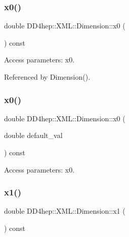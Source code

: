 \subsubsection{\texorpdfstring{x0()}{x0()}\hspace{0.1cm}{\footnotesize\ttfamily [1/2]}}
{\footnotesize\ttfamily double D\+D4hep\+::\+X\+M\+L\+::\+Dimension\+::x0 (\begin{DoxyParamCaption}{ }\end{DoxyParamCaption}) const}



Access parameters\+: x0. 



Referenced by Dimension().

\hypertarget{struct_d_d4hep_1_1_x_m_l_1_1_dimension_af9f958b21cd45072fca22d29a6dd86b4}{}\label{struct_d_d4hep_1_1_x_m_l_1_1_dimension_af9f958b21cd45072fca22d29a6dd86b4} 
\subsubsection{\texorpdfstring{x0()}{x0()}\hspace{0.1cm}{\footnotesize\ttfamily [2/2]}}
{\footnotesize\ttfamily double D\+D4hep\+::\+X\+M\+L\+::\+Dimension\+::x0 (\begin{DoxyParamCaption}\item[{double}]{default\+\_\+val }\end{DoxyParamCaption}) const}



Access parameters\+: x0. 

\hypertarget{struct_d_d4hep_1_1_x_m_l_1_1_dimension_a6ba1cf49b1320c22f96e3be85916e8c5}{}\label{struct_d_d4hep_1_1_x_m_l_1_1_dimension_a6ba1cf49b1320c22f96e3be85916e8c5} 
\subsubsection{\texorpdfstring{x1()}{x1()}\hspace{0.1cm}{\footnotesize\ttfamily [1/2]}}
{\footnotesize\ttfamily double D\+D4hep\+::\+X\+M\+L\+::\+Dimension\+::x1 (\begin{DoxyParamCaption}{ }\end{DoxyParamCaption}) const}



